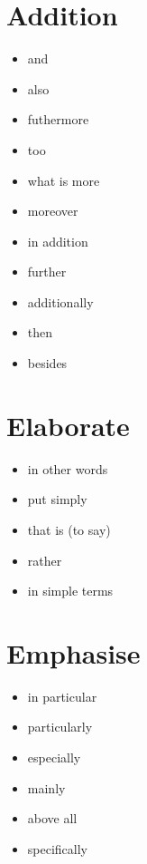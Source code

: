 \documentclass[twocolumn, a4paper]{article}
\begin{document}
\section{Addition}
{\color{myGreen}
	\begin{itemize}[leftmargin=*, noitemsep]
		\item and
		\item also
		\item futhermore
		\item too
		\item what is more
		\item moreover
		\item in addition
		\item further
		\item additionally
		\item then
		\item besides
	\end{itemize}
}

\section{Elaborate}
{\color{ForestGreen}
	\begin{itemize}[leftmargin=*, noitemsep]
		\item in other words
		\item put simply
		\item that is (to say)
		\item rather
		\item in simple terms
	\end{itemize}
}

\section{Emphasise}
{\color{myBlue}
	\begin{itemize}[leftmargin=*, noitemsep]
		\item in particular
		\item particularly
		\item especially
		\item mainly
		\item above all
		\item specifically
	\end{itemize}
}
\end{document}
